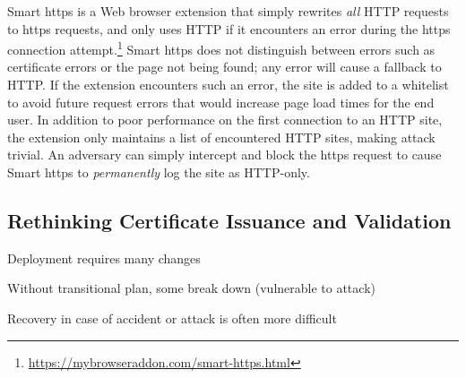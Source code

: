 Smart \ac{https} is a Web browser extension that simply rewrites \emph{all} HTTP
requests to \ac{https} requests, and only uses HTTP if it encounters an error
during the \ac{https} connection
attempt.\footnote{\url{https://mybrowseraddon.com/smart-https.html}} Smart
\ac{https} does not distinguish between errors such as certificate errors or the
page not being found; any error will cause a fallback to HTTP. If the extension
encounters such an error, the site is added to a whitelist to avoid future
request errors that would increase page load times for the end user. In addition
to poor performance on the first connection to an HTTP site, the extension only
maintains a list of encountered HTTP sites, making  attack trivial. An
adversary can simply intercept and block the \ac{https} request to cause Smart
\ac{https} to \emph{permanently} log the site as HTTP-only.

\subsection{Rethinking Certificate Issuance and Validation}

Deployment requires many changes

Without transitional plan, some break down (vulnerable to attack)

Recovery in case of accident or attack is often more difficult






